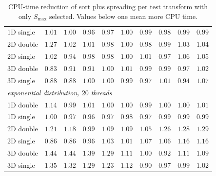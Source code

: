 \begin{table}[p]
\begin{tabular}{lrrrrrrrrr}
        1D single & $1.01$ & $1.00$ & $0.96$ & $0.97$ & $1.00$ & $0.99$ & $0.98$ & $0.99$ & $0.99$ \\
        2D double & $1.27$ & $1.02$ & $1.01$ & $0.98$ & $1.00$ & $0.98$ & $0.99$ & $1.03$ & $1.04$ \\
        2D single & $1.02$ & $0.94$ & $0.98$ & $0.98$ & $1.00$ & $1.01$ & $0.97$ & $1.06$ & $1.05$ \\
        3D double & $0.83$ & $0.91$ & $0.91$ & $1.00$ & $1.01$ & $0.99$ & $0.99$ & $0.97$ & $1.02$ \\
        3D single & $0.88$ & $0.88$ & $1.00$ & $1.00$ & $0.99$ & $0.97$ & $1.01$ & $0.94$ & $1.07$ \\
        \midrule
        \multicolumn{10}{l}{\emph{exponential distribution, $20$ threads}} \\
        1D double & $1.14$ & $0.99$ & $1.01$ & $1.00$ & $1.00$ & $0.99$ & $1.00$ & $1.00$ & $1.01$ \\
        1D single & $1.00$ & $0.97$ & $0.96$ & $0.97$ & $0.98$ & $0.97$ & $0.99$ & $0.99$ & $0.99$ \\
        2D double & $1.21$ & $1.18$ & $0.99$ & $1.09$ & $1.09$ & $1.05$ & $1.26$ & $1.28$ & $1.29$ \\
        2D single & $0.86$ & $0.86$ & $0.96$ & $1.03$ & $1.01$ & $1.07$ & $1.06$ & $1.16$ & $1.16$ \\
        3D double & $1.44$ & $1.44$ & $1.39$ & $1.29$ & $1.11$ & $1.00$ & $0.92$ & $1.11$ & $1.09$ \\
        3D single & $1.35$ & $1.32$ & $1.29$ & $1.23$ & $1.12$ & $0.90$ & $0.97$ & $0.99$ & $1.02$ \\
        \bottomrule
    \end{tabular}
    \caption{CPU-time reduction of sort plus spreading per test transform with only $S_{\max}$ selected. Values below one mean more CPU time.}
    \label{tab:app_sp_work}
\end{table}
